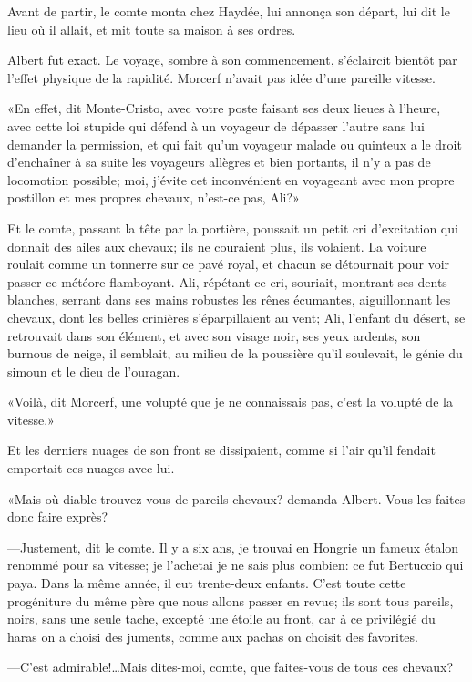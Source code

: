 Avant de partir, le comte monta chez Haydée, lui annonça son départ, lui dit le lieu où il allait, et mit toute sa maison à ses ordres. 

Albert fut exact. Le voyage, sombre à son commencement, s'éclaircit bientôt par l'effet physique de la rapidité. Morcerf n'avait pas idée d'une pareille vitesse. 

«En effet, dit Monte-Cristo, avec votre poste faisant ses deux lieues à l'heure, avec cette loi stupide qui défend à un voyageur de dépasser l'autre sans lui demander la permission, et qui fait qu'un voyageur malade ou quinteux a le droit d'enchaîner à sa suite les voyageurs allègres et bien portants, il n'y a pas de locomotion possible; moi, j'évite cet inconvénient en voyageant avec mon propre postillon et mes propres chevaux, n'est-ce pas, Ali?» 

Et le comte, passant la tête par la portière, poussait un petit cri d'excitation qui donnait des ailes aux chevaux; ils ne couraient plus, ils volaient. La voiture roulait comme un tonnerre sur ce pavé royal, et chacun se détournait pour voir passer ce météore flamboyant. Ali, répétant ce cri, souriait, montrant ses dents blanches, serrant dans ses mains robustes les rênes écumantes, aiguillonnant les chevaux, dont les belles crinières s'éparpillaient au vent; Ali, l'enfant du désert, se retrouvait dans son élément, et avec son visage noir, ses yeux ardents, son burnous de neige, il semblait, au milieu de la poussière qu'il soulevait, le génie du simoun et le dieu de l'ouragan. 

«Voilà, dit Morcerf, une volupté que je ne connaissais pas, c'est la volupté de la vitesse.» 

Et les derniers nuages de son front se dissipaient, comme si l'air qu'il fendait emportait ces nuages avec lui. 

«Mais où diable trouvez-vous de pareils chevaux? demanda Albert. Vous les faites donc faire exprès? 

—Justement, dit le comte. Il y a six ans, je trouvai en Hongrie un fameux étalon renommé pour sa vitesse; je l'achetai je ne sais plus combien: ce fut Bertuccio qui paya. Dans la même année, il eut trente-deux enfants. C'est toute cette progéniture du même père que nous allons passer en revue; ils sont tous pareils, noirs, sans une seule tache, excepté une étoile au front, car à ce privilégié du haras on a choisi des juments, comme aux pachas on choisit des favorites. 

—C'est admirable!\dots Mais dites-moi, comte, que faites-vous de tous ces chevaux? 

